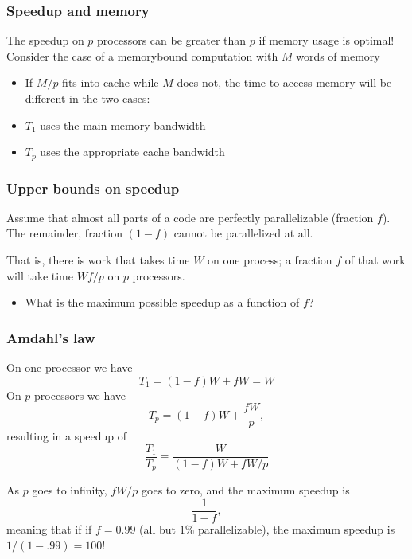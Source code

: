 \documentclass{beamer}
\begin{document}
\begin{frame}
\frametitle{Speedup and memory}

\begin{block}{}
The speedup on $p$ processors can
be greater than $p$ if memory usage is optimal!
Consider the case of a memorybound computation with $M$ words of memory
\begin{itemize}
 \item If $M/p$ fits into cache while $M$ does not, the time to access memory will be different in the two cases:

 \item $T_1$ uses the main memory bandwidth

 \item $T_p$ uses the appropriate cache bandwidth 
\end{itemize}

\noindent
\end{block}
\end{frame}

\begin{frame}
\frametitle{Upper bounds on speedup}

\begin{block}{}
Assume that almost all parts of a code are perfectly
parallelizable (fraction $f$). The remainder,
fraction $(1-f)$ cannot be parallelized at all.

That is, there is work that takes time $W$ on one process; a fraction $f$ of that work will take
time $Wf/p$ on $p$ processors. 
\begin{itemize}
\item What is the maximum possible speedup as a function of $f$? 
\end{itemize}

\noindent
\end{block}
\end{frame}

\begin{frame}
\frametitle{Amdahl's law}

\begin{block}{}
On one processor we have 
\[
T_1 = (1-f)W + fW = W
\]
On $p$ processors we have
\[
T_p = (1-f)W + \frac{fW}{p},
\]
resulting in a speedup of 
\[
\frac{T_1}{T_p} = \frac{W}{(1-f)W+fW/p}
\]

As $p$ goes to infinity, $fW/p$ goes to zero, and the maximum speedup is
\[
\frac{1}{1-f},
\]
meaning that if 
if $f = 0.99$ (all but $1\%$ parallelizable), the maximum speedup
is $1/(1-.99)=100$! 
\end{block}
\end{frame}
\end{document}
